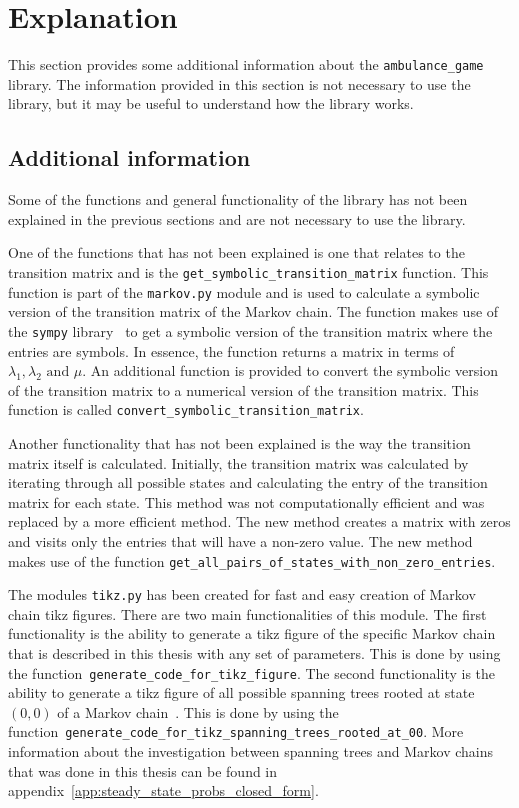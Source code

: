 \section{Explanation}\label{sec:ambulance_game_explanation}

This section provides some additional information about the
\texttt{ambulance\_game} library.
The information provided in this section is not necessary to use the library,
but it may be useful to understand how the library works.

\subsection{Additional information}

Some of the functions and general functionality of the library has not been
explained in the previous sections and are not necessary to use the library.

One of the functions that has not been explained is one that relates to the
transition matrix and is the \texttt{get\_symbolic\_transition\_matrix}
function.
This function is part of the \texttt{markov.py} module and is used to calculate
a symbolic version of the transition matrix of the Markov chain.
The function makes use of the \texttt{sympy} library~\cite{sympy} to get a
symbolic version of the transition matrix where the entries are symbols.
In essence, the function returns a matrix in terms of \(\lambda_1, \lambda_2
\text{ and } \mu\).
An additional function is provided to convert the symbolic version of the
transition matrix to a numerical version of the transition matrix.
This function is called \texttt{convert\_symbolic\_transition\_matrix}.

Another functionality that has not been explained is the way the transition
matrix itself is calculated.
Initially, the transition matrix was calculated by iterating through all
possible states and calculating the entry of the transition matrix for each
state.
This method was not computationally efficient and was replaced by a more
efficient method.
The new method creates a matrix with zeros and visits only the entries that
will have a non-zero value.
The new method makes use of the function
\texttt{get\_all\_pairs\_of\_states\_with\_non\_zero\_entries}.

The modules \texttt{tikz.py} has been created for fast and easy creation of
Markov chain tikz figures.
There are two main functionalities of this module.
The first functionality is the ability to generate a tikz figure of the
specific Markov chain that is described in this thesis with any set of
parameters. 
This is done by using the function~\texttt{generate\_code\_for\_tikz\_figure}.
The second functionality is the ability to generate a tikz figure of all
possible spanning trees rooted at state \((0, 0)\) of a Markov
chain~\cite{sung2016enumeration, levine2011sandpile}.
This is done by using the
function~\texttt{generate\_code\_for\_tikz\_spanning\_trees\_rooted\_at\_00}.
More information about the investigation between spanning trees and Markov
chains that was done in this thesis can be found in
appendix~\ref{app:steady_state_probs_closed_form}.


